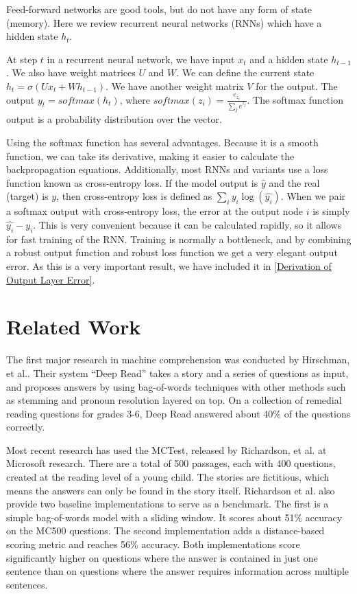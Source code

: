 \documentclass[pageno]{jpaper}
\begin{document}
Feed-forward networks are good tools, but do not have any form of state
(memory). Here we review recurrent neural networks (RNNs) which have a hidden
state $h_t$.

At step $t$ in a recurrent neural network, we have input $x_t$ and a hidden
state $h_{t-1}$. We also have weight matrices $U$ and $W$. We can define the
current state $h_t = \sigma(Ux_t + Wh_{t-1})$. We have another weight matrix $V$
for the output. The output $y_t = softmax(h_t)$, where $softmax(z_i) =
\frac{e_{z_i}}{\sum_j e^{z_j}}$. The softmax function output is a probability
distribution over the vector.

Using the softmax function has several advantages. Because it is a smooth
function, we can take its derivative, making it easier to calculate the
backpropagation equations. Additionally, most RNNs and variants use a loss
function known as cross-entropy loss. If the model output is $\hat{y}$ and the
real (target) is $y$, then cross-entropy loss is defined as $\sum_i y_i
\log(\hat{y_{i}})$. When we pair a softmax output with cross-entropy loss, the
error at the output node $i$ is simply $\hat{y_i} - y_i$. This is very
convenient because it can be calculated rapidly, so it allows for fast training
of the RNN. Training is normally a bottleneck, and by combining a robust output
function and robust loss function we get a very elegant output error. As this is
a very important result, we have included it in \ref{Derivation of Output Layer
Error}.

\section{Related Work}
\label{Related Work}

The first major research in machine comprehension was conducted by Hirschman,
et al.\cite{Hirschman1999}. Their system ``Deep Read'' takes a story and a
series of questions as input, and proposes answers by using bag-of-words
techniques with other methods such as stemming and pronoun resolution layered
on top. On a collection of remedial reading questions for grades 3-6, Deep Read
answered about 40\% of the questions correctly.

Most recent research has used the MCTest\cite{Richardson2013}, released by
Richardson, et al. at Microsoft research. There are a total of 500 passages,
each with 400 questions, created at the reading level of a young child. The
stories are fictitious, which means the answers can only be found in the story
itself. Richardson et al. also provide two baseline implementations to serve as
a benchmark. The first is a simple bag-of-words model with a sliding window. It
scores about 51\% accuracy on the MC500 questions. The second implementation
adds a distance-based scoring metric and reaches 56\% accuracy. Both
implementations score significantly higher on questions where the answer is
contained in just one sentence than on questions where the answer requires
information across multiple sentences.
\end{document}
